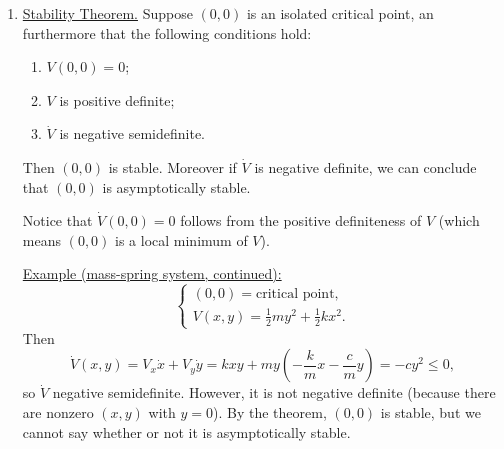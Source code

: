\documentclass[11pt, letterpaper, oneside]{article}     %
\numberwithin{equation}{subsection}
\theoremstyle{definition}
\numberwithin{theorem}{section}
\theoremstyle{remark}
\begin{document}
\begin{enumerate}
  $V$ is said to provide a zeroth order test if it is positive definite. In this situation, we can conclude that $(0,0)$ is stable.

  If $V$ is positive \emph{semidefinite}, we get a first order test. To see what this means, let $(x(t),y(t))$ be a solution curve. We then have
  \begin{equation}
    \frac{d}{dt} V(x(t),y(t))
    = V_x\frac{dx}{dt} + V_y\frac{dy}{dt}
    = V_xF(x,y) + V_yG(x,y).
  \end{equation}
  This calculation motives the definition
  \begin{equation}
    \dot V(x,y) := V_x(x,y)F(x,y) + V_y(x,y)G(x,y).
  \end{equation}
  We have a pair of functions $(V,\dot V)$. $V$ tells us if we have a stable critical point, and the sign of $\dot V$ (the first order test) tells us if it is a source or a sink. This is made precise by the following theorem.

  \medskip

\item \underline{Stability Theorem.} Suppose $(0,0)$ is an isolated critical point, an furthermore that the following conditions hold:
  \begin{enumerate}
  \item $V(0,0) = 0$;
  \item $V$ is positive definite;
  \item $\dot V$ is negative semidefinite.
  \end{enumerate}
  Then $(0,0)$ is stable. Moreover if $\dot V$ is negative definite, we can conclude that $(0,0)$ is asymptotically stable.

  Notice that $\dot V(0,0) = 0$ follows from the positive definiteness of $V$ (which means $(0,0)$ is a local minimum of $V$).

  \underline{Example (mass-spring system, continued):}
  \begin{equation}
    \begin{cases}
      (0,0) = \text{critical point},\\
      V(x,y) = \frac{1}{2}my^2 + \frac{1}{2}kx^2.
    \end{cases}
  \end{equation}
  Then
  \begin{equation}
    \dot V(x,y) = V_x\dot x + V_y\dot y
    = kxy + my\left(-\frac{k}{m}x - \frac{c}{m}y\right)
    = -cy^2 \leq 0,
  \end{equation}
  so $\dot V$ negative semidefinite. However, it is not negative definite (because there are nonzero $(x,y)$ with $y=0$).
  By the theorem, $(0,0)$ is stable, but we cannot say whether or not it is asymptotically stable.


\end{enumerate}
\end{document}
